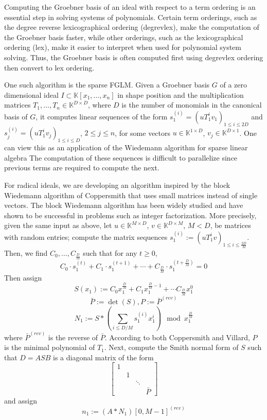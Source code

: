 \documentclass[12pt]{article}
\begin{document}
Computing the Groebner basis of an ideal with respect to a term ordering 
is an essential step in solving systems of polynomials.
Certain term orderings, such as the degree reverse lexicographical ordering (degrevlex),
make the computation of the Groebner basis faster, while other orderings, 
such as the lexicographical ordering (lex), make it easier to interpret when
used for polynomial system solving. Thus, the Groebner basis is often computed
first using degrevlex ordering then convert to lex ordering.

One such algorithm is the sparse FGLM. Given a Groebner basis $G$ of a zero 
dimensional ideal $I \subset \mathbb{K}[x_1, \dots, x_n]$ 
in shape position and the multiplication matrices $T_1,\dots, T_n \in \mathbb{K}^{D \times D}$,
where $D$ is the number of monomials in the canonical basis of $G$, it computes 
linear sequences of the form $s_1^{(i)} = (uT_1^iv_1)_{1\le i \le 2D}$ and
$s_j^{(i)} = (uT_1^iv_j)_{1\le i \le D}$, $2 \le j \le n$, for some vectors $u \in \mathbb{K}^{1 \times D}$,
$v_j \in \mathbb{K}^{D\times 1}$. One can view this as an application of the Wiedemann algorithm 
for sparse linear algebra The computation of these sequences is difficult to parallelize 
since previous terms are required to compute the next. 

For radical ideals, we are developing an algorithm inspired by the block Wiedemann algorithm of Coppersmith
that uses small matrices instead of single vectors. The block Wiedemann algorithm has been 
widely studied and have shown to be successful in problems such as integer factorization.
More precisely, given the same input as above, let $u \in \mathbb{K}^{M \times D}$, $v \in \mathbb{K}^{D \times M}$, $M < D$, be 
matrices with random entries; compute the matrix sequences $s_1^{(i)} := (uT_1^iv)_{1\le i \le \frac{2D}{M}}$. 
Then, we find $C_0, \dots, C_\frac{D}{M}$ such that for any $t \ge 0$,
$$ C_0 \cdot s_1^{(t)} + C_1 \cdot s_1^{(t+1)} + \cdots + C_{\frac{D}{M}} \cdot s_1^{(t+\frac{D}{M})}  = 0$$
Then assign
$$ S(x_1) := C_0  x_1^{\frac{D}{M}} + C_1  x_1^{\frac{D}{M} - 1} + \cdots C_{\frac{D}{M}} x_1^0$$
$$ \bar{P} := \det(S) , P := \bar{P}^{(rev)}$$
$$ N_1 := S * (\sum_{i\le D/M} s_1^{(i)} x_1^i) \mod x_1^{\frac{D}{M}}$$
where $\bar{P}^{(rev)}$ is the reverse of $\bar{P}$. According to both Coppersmith and Villard,
$P$ is the minimal polynomial of $T_1$. Next, compute the Smith normal form 
of $S$ such that $D = A S B$ is a diagonal matrix of the form
$$\begin{bmatrix}
	1 &  &        & \\
	  & 1&        &  \\ 
	  &  & \ddots & \\
	  &  &        & \bar{P}
\end{bmatrix}$$
and assign
$$ n_1 := (A*N_1)[0,M-1]^{(rev)}$$
\end{document}
